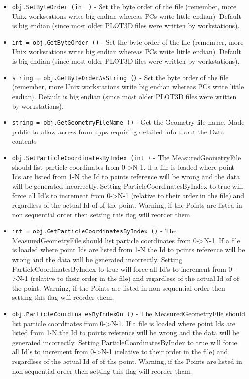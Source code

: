 \begin{itemize}
\item  \verb|obj.SetByteOrder (int )| -  Set the byte order of the file (remember, more Unix workstations
 write big endian whereas PCs write little endian). Default is
 big endian (since most older PLOT3D files were written by
 workstations).

\item  \verb|int = obj.GetByteOrder ()| -  Set the byte order of the file (remember, more Unix workstations
 write big endian whereas PCs write little endian). Default is
 big endian (since most older PLOT3D files were written by
 workstations).

\item  \verb|string = obj.GetByteOrderAsString ()| -  Set the byte order of the file (remember, more Unix workstations
 write big endian whereas PCs write little endian). Default is
 big endian (since most older PLOT3D files were written by
 workstations).

\item  \verb|string = obj.GetGeometryFileName ()| -  Get the Geometry file name. Made public to allow access from 
 apps requiring detailed info about the Data contents

\item  \verb|obj.SetParticleCoordinatesByIndex (int )| -  The MeasuredGeometryFile should list particle coordinates
 from 0->N-1.
 If a file is loaded where point Ids are listed from 1-N
 the Id to points reference will be wrong and the data
 will be generated incorrectly.
 Setting ParticleCoordinatesByIndex to true will force
 all Id's to increment from 0->N-1 (relative to their order
 in the file) and regardless of the actual Id of of the point.
 Warning, if the Points are listed in non sequential order
 then setting this flag will reorder them.

\item  \verb|int = obj.GetParticleCoordinatesByIndex ()| -  The MeasuredGeometryFile should list particle coordinates
 from 0->N-1.
 If a file is loaded where point Ids are listed from 1-N
 the Id to points reference will be wrong and the data
 will be generated incorrectly.
 Setting ParticleCoordinatesByIndex to true will force
 all Id's to increment from 0->N-1 (relative to their order
 in the file) and regardless of the actual Id of of the point.
 Warning, if the Points are listed in non sequential order
 then setting this flag will reorder them.

\item  \verb|obj.ParticleCoordinatesByIndexOn ()| -  The MeasuredGeometryFile should list particle coordinates
 from 0->N-1.
 If a file is loaded where point Ids are listed from 1-N
 the Id to points reference will be wrong and the data
 will be generated incorrectly.
 Setting ParticleCoordinatesByIndex to true will force
 all Id's to increment from 0->N-1 (relative to their order
 in the file) and regardless of the actual Id of of the point.
 Warning, if the Points are listed in non sequential order
 then setting this flag will reorder them.


\end{itemize}
